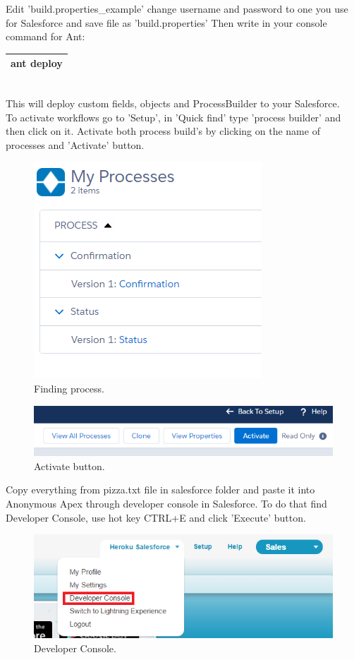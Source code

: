 \documentclass[12pt,a4paper]{article}
\begin{document}
Edit 'build.properties\_example' change username and password to one you use for Salesforce and save file as 'build.properties'
Then write in your console command for Ant:

\begin{tabular}{|l|}
	\hline
	ant deploy\\
	\hline
\end{tabular}\\


This will deploy custom fields, objects and ProcessBuilder to your  Salesforce.\\
To activate workflows go to 'Setup', in 'Quick find' type 'process builder' and then click on it. Activate both process build's by clicking on the name of processes and 'Activate' button.
\begin{figure}[H]
	\centering
	\includegraphics{images/process.PNG}
	\caption{Finding process.}
	\label{fig:process}
\end{figure}
\begin{figure}[H]
	\centering
	\includegraphics{images/process2.PNG}
	\caption{Activate button.}
	\label{fig:processs}
\end{figure}

Copy everything from pizza.txt file in salesforce folder and paste it into Anonymous Apex through developer console in Salesforce.
To do that find Developer Console, use hot key CTRL+E and click 'Execute' button.

\begin{figure}[H]
	\centering
	\includegraphics[width=1\textwidth]{images/deploy1.PNG}
	\caption{Developer Console.}
	\label{fig:console}
\end{figure}
\end{document}
